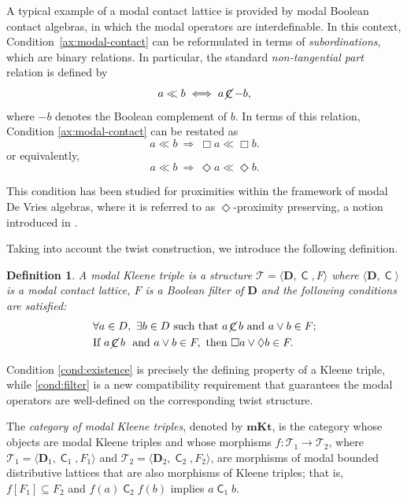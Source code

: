 \documentclass[10pt,a4paper]{amsart}
\newtheorem{definition}[theorem]{Definition}
\DeclareMathOperator{\con}{\mathsf{C}}
\DeclareMathOperator{\notcon}{\cancel{ \con}}
\newcommand{\D}{\mathbf{D}}
\newcommand{\T}{\mathcal{T}}
\begin{document}
A typical example of a modal contact lattice is provided by modal Boolean contact algebras, in which the modal operators are interdefinable. In this context, Condition~\eqref{ax:modal-contact} can be reformulated in terms of \emph{subordinations}, which are binary relations. In particular, the standard \emph{non-tangential part} relation is defined by
\[
a \ll b \;\Longleftrightarrow\; a \notcon -b,
\]
where $-b$ denotes the Boolean complement of $b$. In terms of this relation, Condition \eqref{ax:modal-contact} can be restated as
\[
a \ll b \ \Longrightarrow\ \Box a \ll \Box b.
\]
or equivalently,
\[
a \ll b \ \Longrightarrow\ \Diamond a \ll \Diamond b.
\]

This condition has been studied for proximities within the framework of modal De Vries algebras, where it is referred to as $\Diamond$-proximity preserving, a notion introduced in \cite{bezhanishvili2015modal}.

Taking into account the twist construction, we introduce the following definition.

\begin{definition}
\label{def:modal-triple}
A \emph{modal Kleene triple} is a structure $\T=\langle \D, \con, F\rangle$ where $\langle \D, \con \rangle$ is a modal contact lattice, $F$ is a Boolean filter of $\D$ and the following conditions are satisfied:
\begin{align}
    \label{cond:existence}
    &\forall a \in D,\ \exists b \in D \text{ such that } a\notcon b \text{ and } a \vee b \in F;\\
    \label{cond:filter}
    &\text{If } a\notcon b \ \text{ and } a \vee b \in F, \text{ then } \Box a \vee \Diamond b \in F.
\end{align}
\end{definition}

Condition \eqref{cond:existence} is precisely the defining property of a Kleene triple, while \eqref{cond:filter} is a new compatibility requirement that guarantees the modal operators are well-defined on the corresponding twist structure.

The \emph{category of modal Kleene triples}, denoted by $\mathbf{mKt}$, is the category whose objects are modal Kleene triples and whose morphisms $f:\T_1\to\T_2$, where $\T_1=\langle\D_1,\con_1,F_1\rangle$ and $\T_2=\langle\D_2,\con_2,F_2\rangle$, are morphisms of modal bounded distributive lattices that are also morphisms of Kleene triples; that is,
$f[F_1]\subseteq F_2$ and
$f(a) \con_2 f(b)$ implies $a\con_1 b$.
\end{document}
